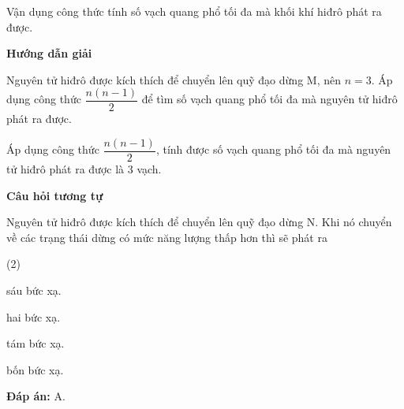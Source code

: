 \begin{dang}{Vận dụng công thức tính số vạch quang phổ tối đa mà khối khí hiđrô phát ra được.}
	
	
	{\begin{center}
			\textbf{Hướng dẫn giải}
		\end{center}
		
		Nguyên tử hiđrô được kích thích để chuyển lên quỹ đạo dừng M, nên $n=3$. Áp dụng công thức $\dfrac{n(n-1)}{2}$ để tìm số vạch quang phổ tối đa mà nguyên tử hiđrô phát ra được.
		
		Áp dụng công thức $\dfrac{n(n-1)}{2}$, tính được số vạch quang phổ tối đa mà nguyên tử hiđrô phát ra được là 3 vạch.
		
		\begin{center}
			\textbf{Câu hỏi tương tự}
		\end{center}
		
		Nguyên tử hiđrô được kích thích để chuyển lên quỹ đạo dừng N. Khi nó chuyển về các trạng thái dừng có mức năng lượng thấp hơn thì sẽ phát ra
		\begin{mcq}(2)
			\item sáu bức xạ.
			\item hai bức xạ.
			\item tám bức xạ.
			\item bốn bức xạ.
		\end{mcq}
		\textbf{Đáp án:} A.
	}
	

\end{dang}
